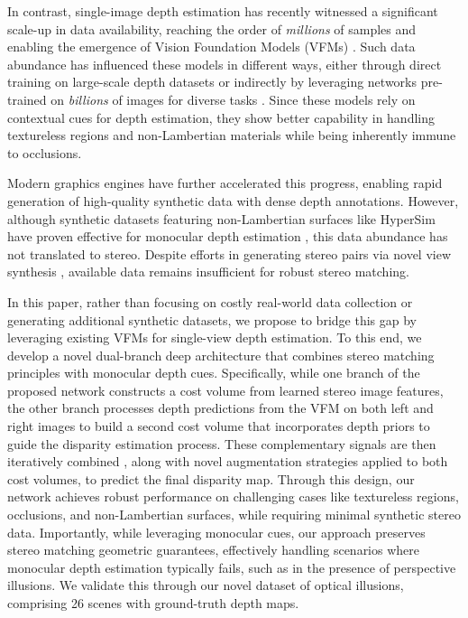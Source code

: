 \documentclass[10pt,twocolumn,letterpaper]{article}
\begin{document}
In contrast, single-image depth estimation has recently witnessed a significant scale-up in data availability, reaching the order of \textit{millions} of samples and enabling the emergence of Vision Foundation Models (VFMs) \cite{depth_anything_v1,depth_anything_v2,ke2023repurposing,fu2024geowizard}. Such data abundance has influenced these models in different ways, either through direct training on large-scale depth datasets  \cite{depth_anything_v1,depth_anything_v2} or indirectly by leveraging networks pre-trained on \textit{billions} of images for diverse tasks \cite{ke2023repurposing,fu2024geowizard}.
Since these models rely on contextual cues for depth estimation, they show better capability in handling textureless regions and non-Lambertian materials \cite{roberts2021,Ramirez_2023_CVPR,Ramirez2024,zamaramirez2024tricky} while being inherently immune to occlusions.

Modern graphics engines have further accelerated this progress, enabling rapid generation of high-quality synthetic data with dense depth annotations. However, although synthetic datasets featuring non-Lambertian surfaces like HyperSim \cite{roberts2021} have proven effective for monocular depth estimation \cite{Ramirez_2023_CVPR,Ramirez2024,zamaramirez2024tricky}, this data abundance has not translated to stereo. Despite efforts in generating stereo pairs via novel view synthesis \cite{Tosi_2023_CVPR,gjerde2024nerf,ling2024self}, available data remains insufficient for robust stereo matching.

In this paper, rather than focusing on costly real-world data collection or generating additional synthetic datasets, we propose to bridge this gap by leveraging existing VFMs for single-view depth estimation.
To this end, we develop a novel dual-branch deep architecture that combines stereo matching principles with monocular depth cues.
Specifically, while one branch of the proposed network constructs a cost volume from learned stereo image features, the other branch processes depth predictions from the VFM on both left and right images to build a second cost volume that incorporates depth priors to guide the disparity estimation process. These complementary signals are then iteratively combined \cite{lipson2021raft}, along with novel augmentation strategies applied to both cost volumes, to predict the final disparity map. Through this design, our network achieves robust performance on challenging cases like textureless regions, occlusions, and non-Lambertian surfaces, while requiring minimal synthetic stereo data. Importantly, while leveraging monocular cues, our approach preserves stereo matching geometric guarantees, effectively handling scenarios where monocular depth estimation typically fails, such as in the presence of perspective illusions. We validate this through our novel dataset of optical illusions, comprising 26 scenes with ground-truth depth maps.
\end{document}
